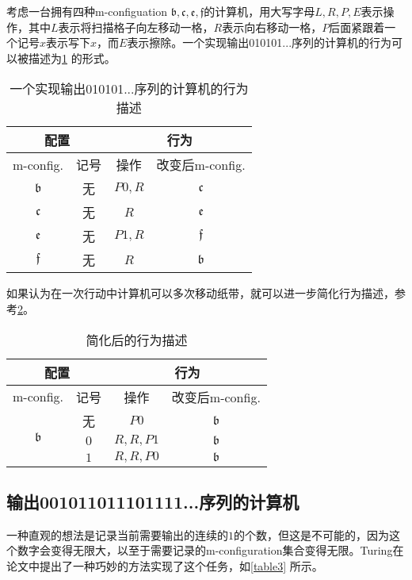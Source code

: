\documentclass[8pt]{article}
\begin{document}
考虑一台拥有四种m-configuation $\mathfrak b, \mathfrak c, \mathfrak e, \mathfrak f$的计算机，用大写字母$L, R, P, E$表示操作，其中$L$表示将扫描格子向左移动一格，$R$表示向右移动一格，$P$后面紧跟着一个记号$x$表示写下$x$，而$E$表示擦除。一个实现输出010101...序列的计算机的行为可以被描述为\cref{table1} 的形式。

\begin{table}[h]
	\centering
	\begin{tabular}{cc|cc}
		\multicolumn{2}{c|}{配置} &  \multicolumn{2}{c}{行为}\\
		\hline
		m-config. & 记号 & 操作 & 改变后m-config.\\
		\hline
		$\mathfrak b$ & 无 & $P0, R$ & $\mathfrak c$\\
		$\mathfrak c$ & 无 & $R$ & $\mathfrak e$\\
		$\mathfrak e$ & 无 & $P1, R$ & $\mathfrak f$\\
		$\mathfrak f$ & 无 & $R$ & $\mathfrak b$\\
	\end{tabular}
	\caption{一个实现输出010101...序列的计算机的行为描述}
	\label{table1}
\end{table}

如果认为在一次行动中计算机可以多次移动纸带，就可以进一步简化行为描述，参考\cref{table2}。
\begin{table}[h]
	\centering
	\begin{tabular}{cc|cc}
		\multicolumn{2}{c|}{配置} &  \multicolumn{2}{c}{行为}\\
		\hline
		m-config. & 记号 & 操作 & 改变后m-config.\\
		\hline
		\multirow{3}{*}{$\mathfrak b$} & 无 & $P0$ & $\mathfrak b$\\
		 & $0$ & $R, R, P1$ & $\mathfrak b$\\
		 & $1$ & $R, R, P0$ & $\mathfrak b$\\
	\end{tabular}
	\caption{简化后的行为描述}
	\label{table2}
\end{table}

\subsection{输出001011011101111...序列的计算机}

一种直观的想法是记录当前需要输出的连续的$1$的个数，但这是不可能的，因为这个数字会变得无限大，以至于需要记录的m-configuration集合变得无限。Turing在论文中提出了一种巧妙的方法实现了这个任务，如\cref{table3} 所示。
\end{document}
